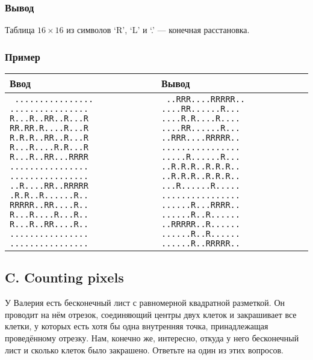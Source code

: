 \documentclass[10pt, a4paper]{article}
\newcommand{\outformat}[1]
{
	\subsubsection*{Вывод} #1
}
\newcommand{\example}[2]
{
	\subsubsection*{Пример}
	\noindent
	\begin{center}
	\begin{tabularx}{\linewidth}{|X|X|}
	\hline
	Ввод & Вывод \\
	\hline
	{\tt #1} & {\tt #2}		\\
	\hline
	\end{tabularx}
	\end{center}
}
\begin{document}
\outformat{Таблица $16 \times 16$  из символов ‘R’, ‘L’ и ‘.’ --- конечная расстановка.}

\example{
................\newline
................\newline
R...R..RR..R...R\newline
RR.RR.R....R...R\newline
R.R.R..RR..R...R\newline
R...R....R.R...R\newline
R...R..RR...RRRR\newline
................\newline
................\newline
..R....RR..RRRRR\newline
.R.R..R......R..\newline
RRRRR..RR....R..\newline
R...R....R...R..\newline
R...R..RR....R..\newline
................\newline
................
}{
..RRR....RRRRR..\newline
....RR......R...\newline
....R.R....R....\newline
....RR......R...\newline
..RRR....RRRRR..\newline
................\newline
.....R......R...\newline
..R.R.R..R.R.R..\newline
..R.R.R..R.R.R..\newline
...R......R.....\newline
................\newline
......R...RRRR..\newline
......R..R......\newline
..RRRRR..R......\newline
......R..R......\newline
......R..RRRRR..
}

\newpage

\subsection*{C. Counting pixels}

У Валерия есть бесконечный лист с равномерной квадратной разметкой. Он проводит на нём отрезок, соединяющий центры двух клеток и закрашивает все клетки, у которых есть хотя бы одна внутренняя точка, принадлежащая проведённому отрезку. Нам, конечно же, интересно, откуда у него бесконечный лист и сколько клеток было закрашено. Ответьте на один из этих вопросов.
 
\end{document}
